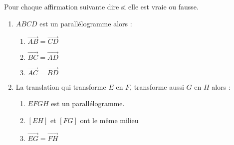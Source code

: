 
Pour chaque affirmation suivante dire si elle est vraie ou fausse.
\begin{enumerate}
\item $ABCD$ est un parallélogramme alors :
  \begin{enumerate}
  \item $\overrightarrow{AB} = \overrightarrow{CD}$
  \item $\overrightarrow{BC} = \overrightarrow{AD}$
  \item $\overrightarrow{AC} = \overrightarrow{BD}$
  \end{enumerate}
\item  La translation qui transforme $E$ en $F$, transforme aussi $G$ en $H$ alors :
  \begin{enumerate}
  \item     $EFGH$ est un parallélogramme.
  \item     $[EH]$ et $[FG]$ ont le même milieu
  \item $\overrightarrow{EG} = \overrightarrow{FH}$
  \end{enumerate}
\end{enumerate} 
  